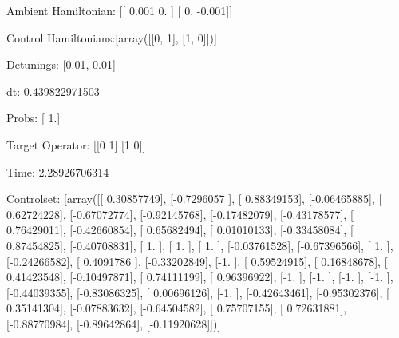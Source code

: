 \documentclass{article}
\begin{document}
    

\newpage

Ambient Hamiltonian: [[ 0.001  0.   ]
 [ 0.    -0.001]]

Control Hamiltonians:[array([[0, 1],
       [1, 0]])]

Detunings: [0.01, 0.01]

 dt: 0.439822971503

Probs: [ 1.]

Target Operator: [[0 1]
 [1 0]]

Time: 2.28926706314

Controlset: [array([[ 0.30857749],
       [-0.7296057 ],
       [ 0.88349153],
       [-0.06465885],
       [ 0.62724228],
       [-0.67072774],
       [-0.92145768],
       [-0.17482079],
       [-0.43178577],
       [ 0.76429011],
       [-0.42660854],
       [ 0.65682494],
       [ 0.01010133],
       [-0.33458084],
       [ 0.87454825],
       [-0.40708831],
       [ 1.        ],
       [ 1.        ],
       [ 1.        ],
       [-0.03761528],
       [-0.67396566],
       [ 1.        ],
       [-0.24266582],
       [ 0.4091786 ],
       [-0.33202849],
       [-1.        ],
       [ 0.59524915],
       [ 0.16848678],
       [ 0.41423548],
       [-0.10497871],
       [ 0.74111199],
       [ 0.96396922],
       [-1.        ],
       [-1.        ],
       [-1.        ],
       [-1.        ],
       [-0.44039355],
       [-0.83086325],
       [ 0.00696126],
       [-1.        ],
       [-0.42643461],
       [-0.95302376],
       [ 0.35141304],
       [-0.07883632],
       [-0.64504582],
       [ 0.75707155],
       [ 0.72631881],
       [-0.88770984],
       [-0.89642864],
       [-0.11920628]])]
\end{document}
